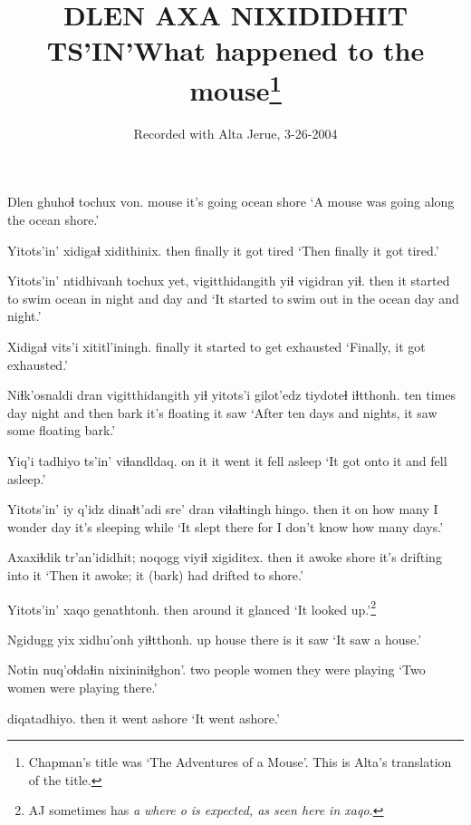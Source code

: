 \documentclass[12pt]{article}
\begin{document}
\title{DLEN AXA NIXIDIDHIT TS'IN'\newline What happened to the mouse\footnote{Chapman's title
was `The Adventures of a Mouse'. This is Alta's translation of the title.}}
\author{Recorded with Alta Jerue, 3-26-2004}
\date{}
\maketitle

\gll Dlen ghuhoɬ tochux von.
mouse {it's going} ocean shore
\glt `A mouse was going along the ocean shore.'
\glend

\gll Yitots'in' xidigaɬ xidithinix.
then finally {it got tired}
\glt `Then finally it got tired.'
\glend

\gll Yitots'in' ntidhivanh tochux yet, vigitthidangith yiɬ vigidran yiɬ.
then {it started to swim} ocean in night and day and
\glt `It started to swim out in the ocean day and night.'
\glend

\gll Xidigaɬ {vits'i xititl'iningh.}
finally {it started to get exhausted}
\glt `Finally, it got exhausted.'
\glend

\gll Niɬk'osnaldi dran vigitthidangith yiɬ yitots'i gilot'edz tiydoteɬ iɬtthonh.
{ten times} day night and then bark {it's floating} {it saw}
\glt `After ten days and nights, it saw some floating bark.'
\glend

\gll Yiq'i tadhiyo ts'in' viɬandldaq.
{on it} {it went} {} {it fell asleep}
\glt `It got onto it and fell asleep.'
\glend

\gll Yitots'in' iy q'idz dinaɬt'adi sre' dran viɬaɬtingh hingo.
then it on {how many} {I wonder} day {it's sleeping} while
\glt `It slept there for I don't know how many days.'
\glend

\gll Axaxiɬdik tr'an'ididhit; noqogg {viyiɬ xigiditex.}
then {it awoke} shore {it's drifting into it}
\glt `Then it awoke; it (bark) had drifted to shore.'
\glend

\gll Yitots'in' xaqo genathtonh.
then around {it glanced}
\glt `It looked up.'\footnote{AJ sometimes has \em a \em where \em o \em is expected, as seen here in \em xaqo.}
\glend

\gll Ngidugg yix xidhu'onh yiɬtthonh.
up house {there is} {it saw}
\glt `It saw a house.'
\glend

\gll Notin nuq'oɬdaɬin nixininiɬghon'.
{two people} women {they were playing}
\glt `Two women were playing there.'
\glend

 diqatadhiyo.
then {it went ashore}
\glt `It went ashore.'
\glend
\end{document}
